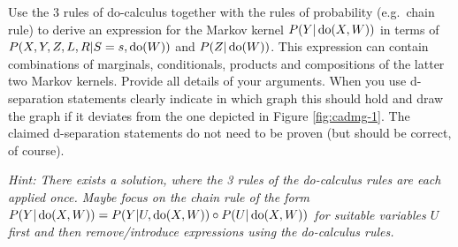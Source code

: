 Use the 3 rules of do-calculus together with the rules of probability (e.g.\ chain rule) to derive an expression for the Markov kernel $P(Y|\operatorname{do}(X,W))$ in terms of $P(X,Y,Z,L,R|S=s,\operatorname{do}(W))$ and $P(Z|\operatorname{do}(W))$. This expression can contain combinations of marginals, conditionals, products and compositions of the latter two Markov kernels. 
Provide all details of your arguments.
When you use d-separation statements clearly indicate in which graph this should hold and draw the graph if it deviates from the one depicted in Figure \ref{fig:cadmg-1}.
The claimed d-separation statements do not need to be proven (but should be correct, of course).

\emph{Hint: There exists a solution, where the 3 rules of the do-calculus rules are each applied once. Maybe focus on the chain rule of the form $P(Y|\operatorname{do}(X,W)) = P(Y|U,\operatorname{do}(X,W)) \circ P(U|\operatorname{do}(X,W))$ for suitable variables $U$ first and then remove/introduce expressions using the do-calculus rules.}

